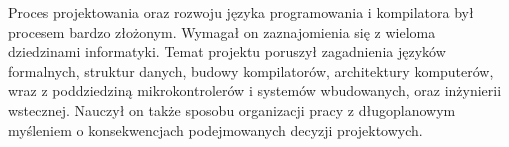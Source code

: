 Proces projektowania oraz rozwoju języka programowania i kompilatora był procesem bardzo złożonym. Wymagał on zaznajomienia się z wieloma dziedzinami informatyki. Temat projektu poruszył zagadnienia języków formalnych, struktur danych, budowy kompilatorów, architektury komputerów, wraz z poddziedziną mikrokontrolerów i systemów wbudowanych, oraz inżynierii wstecznej. Nauczył on także sposobu organizacji pracy z długoplanowym myśleniem o konsekwencjach podejmowanych decyzji projektowych.


